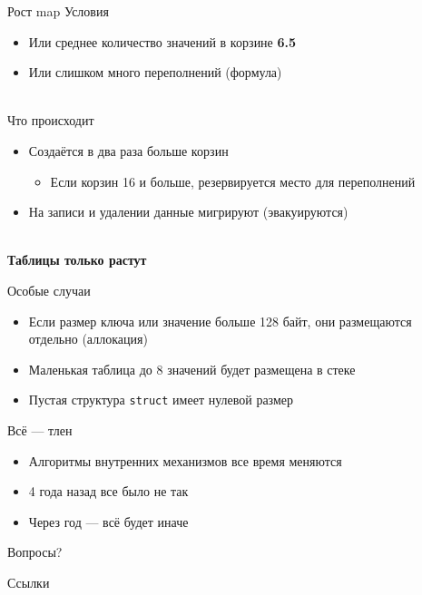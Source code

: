 \documentclass[aspectratio=169]{beamer}
\begin{document}

\begin{frame}{Рост map}
        Условия
        \begin{itemize}
                \item Или среднее количество значений в корзине \textbf{6.5}
                \item Или слишком много переполнений (формула)
        \end{itemize}
        ~\\
        Что происходит
        \begin{itemize}
                \item Создаётся в два раза больше корзин
                \begin{itemize}
                        \item Если корзин 16 и больше, резервируется место для переполнений
                \end{itemize}
                \item На записи и удалении данные мигрируют (эвакуируются)
        \end{itemize}
        ~\\
        \textbf{Таблицы только растут}
\end{frame}

\begin{frame}{Особые случаи}
        \begin{itemize}
                \item Если размер ключа или значение больше 128 байт, они размещаются отдельно (аллокация)
                \item Маленькая таблица до 8 значений будет размещена в стеке
                \item Пустая структура \texttt{struct{}} имеет нулевой размер
        \end{itemize}
\end{frame}

\begin{frame}{Всё --- тлен}
        \begin{itemize}
                \item Алгоритмы внутренних механизмов все время меняются
                \item 4 года назад все было не так
                \item Через год --- всё будет иначе
        \end{itemize}
\end{frame}

\begin{frame}
        \center \huge Вопросы?
\end{frame}

\nocite{*}
\begin{frame}[t]{Ссылки}
\printbibliography
\end{frame}
\end{document}
